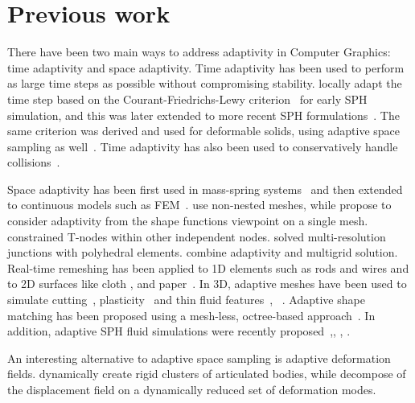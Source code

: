 \section{Previous work}
There have been two main ways to address adaptivity in Computer Graphics: time adaptivity and space adaptivity.
Time adaptivity has been used to perform as large time steps as possible without compromising stability. \cite{Desbrun:1996:SPN} locally adapt the time step based on the Courant-Friedrichs-Lewy criterion~\cite{Press:1992:NRC:148286} for early SPH simulation, and this was later extended to more recent SPH formulations~\cite{Bender_boundaryhandling}. The same criterion was derived and used for deformable solids, using adaptive space sampling as well~\cite{DDBC99,DDCB01}.
Time adaptivity has also been used to conservatively handle collisions~\cite{Harmon:2009:ACM}.

Space adaptivity has been first used in mass-spring systems~\cite{Hutchinson97AdaptiveMassspring,ganovelli99multires} and then extended to continuous models such as FEM~\cite{wu01adaptive}.
\cite{DDCB01} use non-nested meshes, while \cite{CHARMS} propose to consider adaptivity from the shape functions viewpoint on a single mesh. %
\cite{Sifakisy:hybrid:2007} constrained T-nodes within other independent nodes.
\cite{Martin:PolyhedralFEM:2008} solved multi-resolution junctions with polyhedral elements.
\cite{Otaduymultigrid} combine adaptivity and multigrid solution.
Real-time remeshing has been applied to 1D elements such as rods and wires \cite{Lenoir:spline:2005,Spillmann:rods:08,Lacoursiere:wire:tvcg11} and to 2D surfaces like cloth \cite{BenDeu12}, \cite{Narain:2012:AAR} and paper~\cite{Narain:2013:FCA}.
In 3D, adaptive meshes have been used to simulate cutting~\cite{cotin_hybrid}, plasticity~\cite{Bargteil:2007,Wicke:2010} and thin fluid features~\cite{Wojtan:2008}, ~\cite{Tetflip2013}.
Adaptive shape matching has been proposed using a  mesh-less, octree-based approach~\cite{Steinemann:adaptiveshapematching:2008}.
In addition, adaptive SPH fluid simulations were recently proposed~\cite{Adams:2007:ASP},\cite{Solenthaler:2011:TPS:2010324.1964976}, \cite{Goswami2011}, \cite{Orthmann:2012:TBA:2393476.2393484}.

An interesting alternative to adaptive space sampling is adaptive deformation fields.
\cite{Redon:adaptivearticulated:2005} dynamically create rigid clusters of articulated bodies, while
\cite{Kim:2009:SSD} decompose of the displacement field on a dynamically reduced set of deformation modes.

